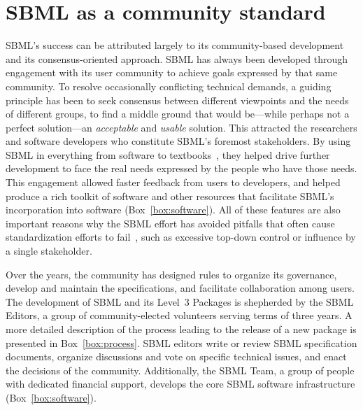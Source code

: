 \documentclass[]{draft-sbml-paper}
\begin{document}
\hrulefill

\newpage
\section*{SBML as a community standard}


SBML's success can be attributed largely to its community-based development and its consensus-oriented approach. SBML has always been developed through engagement with its user community to achieve goals expressed by that same community. To resolve occasionally conflicting technical demands, a guiding principle has been to seek consensus between different viewpoints and the needs of different groups, to find a middle ground that would be---while perhaps not a perfect solution---an \emph{acceptable} and \emph{usable} solution. This attracted the researchers and software developers who constitute SBML's foremost stakeholders. By using SBML in everything from software to textbooks~\citep[e.g.,][]{Cesario2011cancer, Sullivan2012introduction, Wilkinson2018stochastic, Klipp2016systems, Choi2010systems, Jack2009discrete, Govindjee2009photosynthesis, Liu2009systems, Choi2008introduction, Sauro2014systems, DiStefano2015dynamic}, they helped drive further development to face the real needs expressed by the people who have those needs.  This engagement allowed faster feedback from users to developers, and helped produce a rich toolkit of software and other resources that facilitate SBML's incorporation into software (Box~\ref{box:software}).  All of these features are also important reasons why the SBML effort has avoided pitfalls that often cause standardization efforts to fail~\citep{Cargill2011why}, such as excessive top-down control or influence by a single stakeholder.

Over the years, the community has designed rules to organize its governance, develop and maintain the specifications, and facilitate collaboration among users.  The development of SBML and its Level~3 Packages is shepherded by the SBML Editors, a group of community-elected volunteers serving terms of three years. A more detailed description of the process leading to the release of a new package is presented in Box~\ref{box:process}. SBML editors write or review SBML specification documents, organize discussions and vote on specific technical issues, and enact the decisions of the community. Additionally, the SBML Team, a group of people with dedicated financial support, develops the core SBML software infrastructure (Box~\ref{box:software}).
\end{document}
